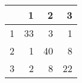 \begin{tabular}{rrrr}
  \hline
 & 1 & 2 & 3 \\ 
  \hline
1 &  33 &   3 &   1 \\ 
  2 &   1 &  40 &   8 \\ 
  3 &   2 &   8 &  22 \\ 
   \hline
\end{tabular}
